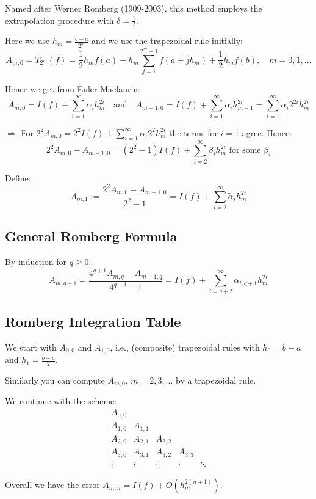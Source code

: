 Named after Werner Romberg (1909-2003), this method employs the extrapolation procedure with $\delta = \frac{1}{2}$.

Here we use $h_m = \frac{b-a}{2^m}$ and we use the trapezoidal rule initially:
\[A_{m,0} = T_{2^m}(f) = \frac{1}{2} h_m f(a) + h_m \sum_{j=1}^{2^m-1} f(a + jh_m) + \frac{1}{2} h_m f(b), \quad m = 0,1,\ldots\]

Hence we get from Euler-Maclaurin:
\[A_{m,0} = I(f) + \sum_{i=1}^{\infty} \alpha_i h_m^{2i} \quad \text{and} \quad A_{m-1,0} = I(f) + \sum_{i=1}^{\infty} \alpha_i h_{m-1}^{2i} = \sum_{i=1}^{\infty} \alpha_i 2^{2i} h_m^{2i}\]

$\Rightarrow$ For $2^2 A_{m,0} = 2^2 I(f) + \sum_{i=1}^{\infty} \alpha_i 2^2 h_m^{2i}$ the terms for $i = 1$ agree. Hence:
\[2^2 A_{m,0} - A_{m-1,0} = (2^2 - 1) I(f) + \sum_{i=2}^{\infty} \beta_i h_m^{2i} \text{ for some } \beta_i\]

Define:
\[A_{m,1} := \frac{2^2 A_{m,0} - A_{m-1,0}}{2^2 - 1} = I(f) + \sum_{i=2}^{\infty} \tilde{\alpha}_i h_m^{2i}\]

\subsection{General Romberg Formula}

By induction for $q \geq 0$:
\[A_{m,q+1} = \frac{4^{q+1} A_{m,q} - A_{m-1,q}}{4^{q+1} - 1} = I(f) + \sum_{i=q+2}^{\infty} \alpha_{i,q+1} h_m^{2i}\]

\subsection{Romberg Integration Table}

We start with $A_{0,0}$ and $A_{1,0}$, i.e., (composite) trapezoidal rules with $h_0 = b-a$ and $h_1 = \frac{b-a}{2}$.

Similarly you can compute $A_{m,0}$, $m = 2,3,\ldots$ by a trapezoidal rule.

We continue with the scheme:
\[
\begin{array}{cccccc}
A_{0,0} \\
A_{1,0} & A_{1,1} \\
A_{2,0} & A_{2,1} & A_{2,2} \\
A_{3,0} & A_{3,1} & A_{3,2} & A_{3,3} \\
\vdots  & \vdots  & \vdots  & \vdots  & \ddots
\end{array}
\]

Overall we have the error $A_{m,n} = I(f) + O(h_m^{2(n+1)})$.

